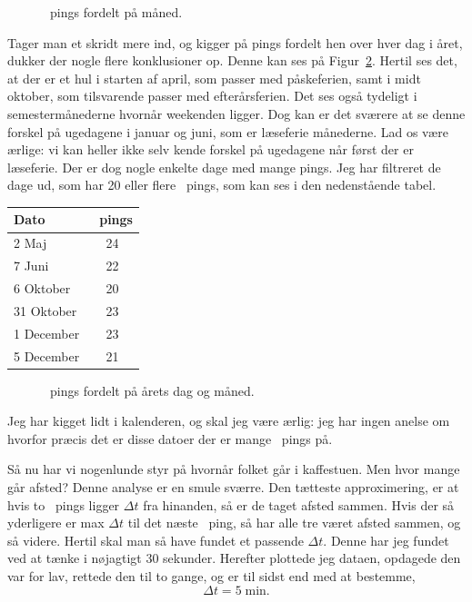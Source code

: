 \begin{article}
\begin{figure}[H]
	\centering
	\resizebox{\columnwidth}{!}{}
	\vspace{-25pt}
	\caption{\protect\coffee\ pings fordelt på måned.}
	\label{fig:2}
\end{figure}

Tager man et skridt mere ind, og kigger på pings fordelt hen over hver dag i året, dukker der nogle flere konklusioner op. Denne kan ses på Figur~\ref{fig:3}. Hertil ses det, at der er et hul i starten af april, som passer med påskeferien, samt i midt oktober, som tilsvarende passer med efterårsferien. Det ses også tydeligt i semestermånederne hvornår weekenden ligger. Dog kan er det sværere at se denne forskel på ugedagene i januar og juni, som er læseferie månederne. Lad os være ærlige: vi kan heller ikke selv kende forskel på ugedagene når først der er læseferie. Der er dog nogle enkelte dage med mange pings. Jeg har filtreret de dage ud, som har 20 eller flere \coffee\ pings, som kan ses i den nedenstående tabel.
\begin{center}
    \begin{tabular}{l|c}
		Dato & \coffee\ pings \\ \hline
		\phantom{3}2 Maj & 24 \\
		\phantom{3}7 Juni & 22 \\
		\phantom{3}6 Oktober & 20 \\
		31 Oktober & 23 \\
		\phantom{3}1 December & 23 \\
		\phantom{3}5 December & 21
    \end{tabular}
\end{center}
\begin{figure}[t!]
	\centering
	\resizebox{2\columnwidth}{!}{}
	\vspace{-20pt}
	\caption{\protect\coffee\ pings fordelt på årets dag og måned.}
	\label{fig:3}
\end{figure}

\noindent
Jeg har kigget lidt i kalenderen, og skal jeg være ærlig: jeg har ingen anelse om hvorfor præcis det er disse datoer der er mange \coffee\ pings på.

Så nu har vi nogenlunde styr på hvornår folket går i kaffestuen. Men hvor mange går afsted? Denne analyse er en smule sværre. Den tætteste approximering, er at hvis to \coffee\ pings ligger $\Delta t$ fra hinanden, så er de taget afsted sammen. Hvis der så yderligere er max $\Delta t$ til det næste \coffee\ ping, så har alle tre været afsted sammen, og så videre. Hertil skal man så have fundet et passende $\Delta t$. Denne har jeg fundet ved at tænke i nøjagtigt 30 sekunder. Herefter plottede jeg dataen, opdagede den var for lav, rettede den til to gange, og er til sidst end med at bestemme,
\[ \Delta t = 5 \; \text{min}. \]


\end{article}
